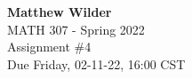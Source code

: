 \documentclass[12pt]{article}
\begin{document}
\pagestyle{fancy}
\fancyhf{}

\noindent \textbf{Matthew Wilder}\\MATH 307 - Spring 2022 \\
Assignment \#4 \\
Due Friday, 02-11-22, 16:00 CST \\


\end{document}
